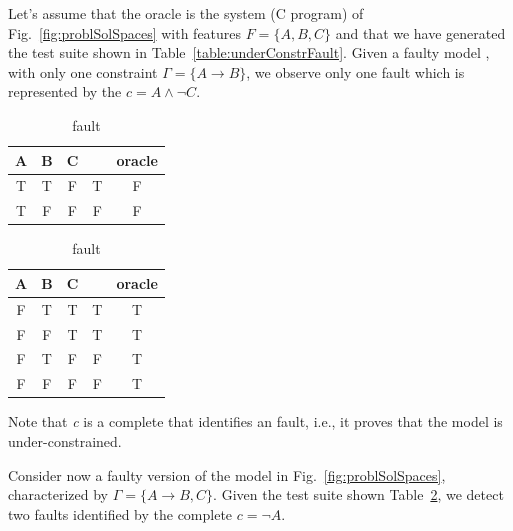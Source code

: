 \begin{tikzborder}{\cite{Gargantini16:validation}}
\begin{tikzborder}{\cite{gargantini_combinatorial_2017}}
\begin{tikzborder}{\cite{gargantini_combinatorial_2017}}
\begin{tikzborder}{\cite{garn2019}}
\begin{tikzborder}{\cite{arcaini2019achieving}}
\begin{tikzborder}{\cite{arcaini2019varivolution}}
		\begin{exmp}\label{ex:example1}
			\bb Let's assume that the oracle is the system (C program) of Fig.~\ref{fig:problSolSpaces} with features $F = \{A,B,C\}$ and that we have generated the test suite shown in Table~\ref{table:underConstrFault}. Given a faulty model \mfU, with only one constraint $\Gamma = \{A\rightarrow B\}$, we observe only one fault which is represented by the \fcc $c = A \wedge \neg C$.\be
			\begin{table}[!htb]
				\caption{Test suites with faults (in gray)}
				\label{table:testsandfaults1}
				\begin{subtable}[t]{.5\columnwidth}
					\centering
					\caption{\underConstr fault}
					\label{table:underConstrFault}
					\begin{tabular}{c|c|c||c|c}
						A & B & C & \mfU & oracle\\
						\hline 
						T & T & F & \cg T & \cg F\\%
						T & F & F & F & F\\
					\end{tabular}
				\end{subtable}%
				\begin{subtable}[t]{.5\columnwidth}
					\centering
					\caption{\overConstr fault}
					\label{table:overConstrFault}
					\begin{tabular}{c|c|c||c|c}
						A & B & C & \mfO & oracle\\
						\hline 
						F & T & T & T & T\\
						F & F & T & T & T\\
						F & T & F & \cg F & \cg T\\%
						F & F & F & \cg F & \cg T\\%
					\end{tabular}
				\end{subtable}%
			\end{table}
			\bb Note that \emph{c} is a complete \fcc that identifies an \underConstr fault, i.e., it proves that the model is under-constrained. \be
		\end{exmp}
		\bb
		\begin{exmp}\label{ex:example2}
			Consider now a faulty version \mfO of the model in Fig.~\ref{fig:problSolSpaces}, characterized by $\Gamma = \{A\rightarrow B, C\}$. Given the test suite shown Table~\ref{table:overConstrFault}, we detect two \overConstr faults identified by the complete \fcc $c = \neg A$.
		\end{exmp} \be
		

\end{tikzborder}
\end{tikzborder}
\end{tikzborder}
\end{tikzborder}
\end{tikzborder}
\end{tikzborder}
